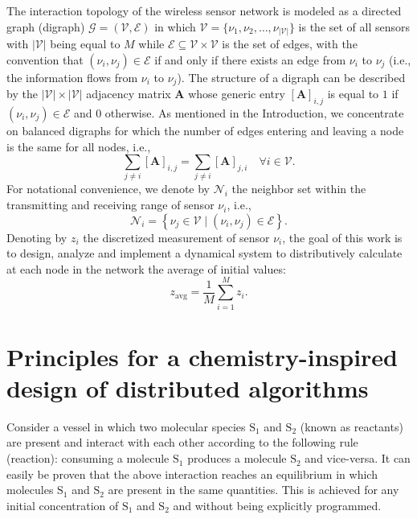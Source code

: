 \documentclass[journal]{IEEEtran}
\newcommand{\mol}[1]{\ensuremath{\textrm{#1}}}
\begin{document}
The interaction topology of the wireless sensor network is modeled as a {directed graph (digraph)} $\mathcal G = (\mathcal V, \mathcal E)$ in which $\mathcal V = \{\nu_1,\nu_2,\ldots, \nu_{|\mathcal V|}\}$ is the set of all sensors with $|\mathcal V|$ being equal to $M$ while $\mathcal E \subseteq \mathcal V \times \mathcal V$ is the set of edges, with the convention that $(\nu_i, \nu_j ) \in \mathcal E$ if and only if there exists an edge from {$\nu_i$ to $\nu_j$} (i.e., the information flows from {$\nu_i$ to $\nu_j$}). The structure of a digraph can be described by the $|\mathcal V| \times |\mathcal V|$ adjacency matrix $\mathbf {A}$ whose generic entry $[\mathbf {A}]_{i,j}$ is equal to $1$ if $(\nu_i,\nu_j) \in \mathcal E$ and $0$ otherwise.  
As mentioned in the Introduction, we concentrate on balanced digraphs for which the number of edges entering and leaving a node is the same for all nodes, i.e.,
\begin{equation}\label{10.10}
\sum\limits_{j\ne i} [\mathbf {A}]_{i,j} = \sum\limits_{j\ne i}[\mathbf {A}]_{j,i}\quad \forall i \in \mathcal V.
\end{equation}
For notational convenience, we denote by $\mathcal{N}_i$ the neighbor set within the transmitting and receiving range of sensor $\nu_i$, i.e.,
\begin{equation}
\mathcal{N}_i = \left\{ \nu_j \in \mathcal V \;| \;(\nu_i,\nu_j) \in \mathcal E \right\}.
\end{equation}
Denoting by $z_i$ the {discretized} measurement of sensor $\nu_i$, the goal of this work is to {design, analyze and implement} a dynamical system to distributively calculate {at each node in the network} the average of initial values:
\begin{equation} \label{eq:scope}
z_\textrm{avg} = \frac{1}{ M}\sum\limits_{i =1}^{M} {{z_i}}.
\end{equation}



\section{Principles for a chemistry-inspired design of distributed algorithms}
\label{sec:IntroChem}
Consider a vessel in which two molecular species $\mol{S}_1$ and $\mol{S}_2$ (known as reactants) are present and interact {with} each other according to the following rule (reaction): consuming a molecule $\mol{S}_1$ produces a molecule $\mol{S}_2$ and vice-versa. It can easily be proven that the above interaction reaches an equilibrium in which molecules $\mol{S}_1$ and $\mol{S}_2$ are present in the same quantities. This is achieved for any initial concentration of $\mol{S}_1$ and $\mol{S}_2$ and without being explicitly programmed. 
\end{document}
